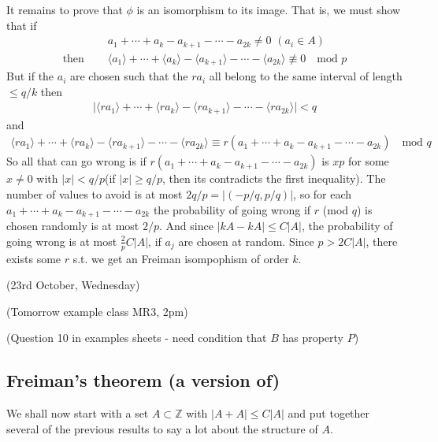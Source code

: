 \documentclass[10pt,a4paper]{report}
\newenvironment{proof}
{\begin{changemargin}{1cm}{0.5cm}
	}%
	{\end{changemargin}
}
\begin{document}
\begin{proof}
It remains to prove that $\phi$ is an isomorphism to its image. That is, we must show that if 
\begin{align*}
& a_1 + \cdots + a_k - a_{k+1} - \cdots - a_{2k} \neq 0 \,\, (a_i \in A)\\
\text{then } \quad & \langle a_1 \rangle + \cdots + \langle a_k \rangle - \langle a_{k+1} \rangle - \cdots - \langle a_{2k} \rangle \not\equiv 0 \quad \text{mod }p
\end{align*}
But if the $a_i$ are chosen such that the $ra_i$ all belong to the same interval of length $\leq q/k$ then
\begin{align*}
\Big|\langle ra_1 \rangle + \cdots + \langle ra_k \rangle - \langle ra_{k+1} \rangle - \cdots - \langle ra_{2k} \rangle \Big|  < q
\end{align*}
and
\begin{align*}
\langle ra_1 \rangle + \cdots + \langle ra_k \rangle - \langle ra_{k+1} \rangle - \cdots - \langle ra_{2k} \rangle \equiv r(a_1 + \cdots + a_k - a_{k+1} - \cdots -a_{2k}) \quad \text{mod } q
\end{align*}
So all that can go wrong is if $r(a_1 + \cdots + a_k - a_{k+1} - \cdots - a_{2k})$ is $xp$ for some $x\neq 0$ with $|x|<q/p$(if $|x|\geq q/p$, then its contradicts the first inequality). The number of values to avoid is at most $2q/p=|(-p/q,p/q)|$, so for each $a_1+ \cdots +a_k -a_{k+1} - \cdots - a_{2k}$ the probability of going wrong if $r$ (mod $q$) is chosen randomly is at most $2/p$. And since $|kA-kA|\leq C|A|$, the probability of going wrong is at most $\frac{2}{p} C|A|$, if $a_j$ are chosen at random. Since $p>2C|A|$, there exists some $r$ s.t. we get an Freiman isompophism of order $k$.

\eop
\end{proof}
\s

\newday

(23rd October, Wednesday)
\s

(Tomorrow example class MR3, 2pm)

(Question 10 in examples sheets - need condition that $B$ has property $P$)
\s

\subsection*{Freiman's theorem (a version of)}
\s

We shall now start with a set $A\subset \mathbb{Z}$ with $|A+A| \leq C|A|$ and put together several of the previous results to say a lot about the structure of $A$. 
\end{document}
